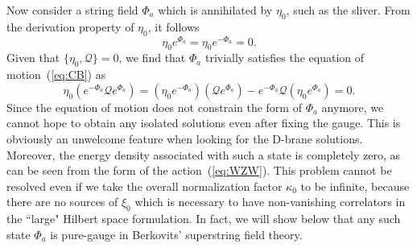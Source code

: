 \documentclass[a4paper,12pt]{article}
\newcommand{\cQ}{\mathcal{Q}}
\begin{document}
Now consider a string field $\Phi_a$ which is annihilated by $\eta_0$, such as the sliver. 
From the derivation property of $\eta_0$, it follows 
\begin{equation}
\eta_0 e^{\Phi_a}=\eta_0 e^{-\Phi_a}=0. \label{eq:RA}
\end{equation}
Given that $\{\eta_0,\cQ\}=0$, we find that $\Phi_a$ trivially satisfies the equation 
of motion~(\ref{eq:CB}) as 
\begin{equation}
\eta_0\left(e^{-\Phi_a}\cQ e^{\Phi_a}\right)=(\eta_0 e^{-\Phi_a})(\cQ e^{\Phi_a})-e^{-\Phi_a}
\cQ (\eta_0 e^{\Phi_a})=0. \label{eq:RB}
\end{equation}
Since the equation of motion does not constrain the form of $\Phi_a$ anymore, we cannot 
hope to obtain any isolated solutions even after fixing the gauge. 
This is obviously an unwelcome feature when looking for the D-brane solutions. 
Moreover, the energy density associated with such a state is completely zero, as can be 
seen from the form of the action~(\ref{eq:WZW}). This problem cannot be resolved even if 
we take the overall normalization factor $\kappa_0$ to be infinite, because there are no sources 
of $\xi_0$ which is necessary to have non-vanishing correlators in the ``large" Hilbert space 
formulation. In fact, we will show below that 
any such state $\Phi_a$ is pure-gauge in Berkovits' superstring field theory. 
\smallskip
\end{document}
